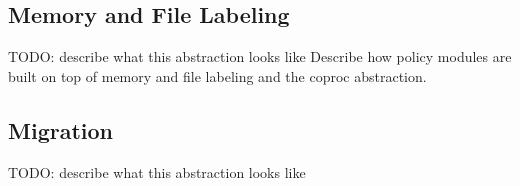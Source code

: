 \subsection{Memory and File Labeling}

TODO: describe what this abstraction looks like
Describe how policy modules are built on top of memory and file labeling and
the coproc abstraction.


\subsection{Migration}

TODO: describe what this abstraction looks like



